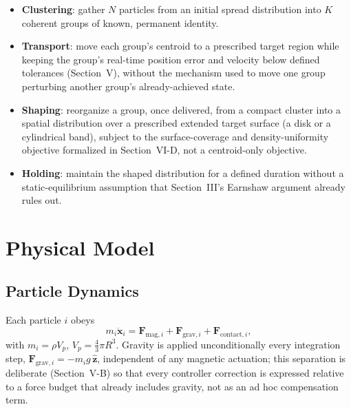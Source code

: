 \documentclass[journal]{IEEEtran}
\begin{document}
\begin{itemize}
\item \textbf{Clustering}: gather $N$ particles from an initial spread
distribution into $K$ coherent groups of known, permanent identity.
\item \textbf{Transport}: move each group's centroid to a prescribed target
region while keeping the group's real-time position error and velocity
below defined tolerances (Section~V), without the mechanism used to move
one group perturbing another group's already-achieved state.
\item \textbf{Shaping}: reorganize a group, once delivered, from a compact
cluster into a spatial distribution over a prescribed extended target
surface (a disk or a cylindrical band), subject to the surface-coverage
and density-uniformity objective formalized in Section~VI-D, not a
centroid-only objective.
\item \textbf{Holding}: maintain the shaped distribution for a defined
duration without a static-equilibrium assumption that Section~III's
Earnshaw argument already rules out.
\end{itemize}

\section{Physical Model}

\subsection{Particle Dynamics}
Each particle $i$ obeys
\begin{equation}
m_i\ddot{\mathbf{x}}_i = \mathbf{F}_{\mathrm{mag},i} + \mathbf{F}_{\mathrm{grav},i}
+ \mathbf{F}_{\mathrm{contact},i},
\label{eq:eom}
\end{equation}
with $m_i = \rho V_p$, $V_p = \tfrac{4}{3}\pi R^3$. Gravity is applied
unconditionally every integration step,
$\mathbf{F}_{\mathrm{grav},i} = -m_i g\,\hat{\mathbf{z}}$, independent of any
magnetic actuation; this separation is deliberate (Section~V-B) so that
every controller correction is expressed relative to a force budget that
already includes gravity, not as an ad hoc compensation term.
\end{document}
